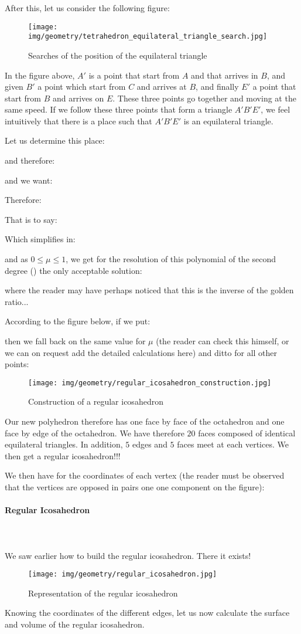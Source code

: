 {	After this, let us consider the following figure:
	\begin{figure}[H]
		\centering
		\texttt{[image: img/geometry/tetrahedron\_equilateral\_triangle\_search.jpg]}
		\caption{Searches of the position of the equilateral triangle}
	\end{figure}
	In the figure above, $A'$ is a point that start from $A$ and that arrives in $B$, and given $B'$ a point which start from $C$ and arrives at $B$, and finally $E'$ a point that start from $B$ and arrives on $E$. These three points go together and moving at the same speed. If we follow these three points that form a triangle $A'B'E'$, we feel intuitively that there is a place such that $A'B'E'$ is an equilateral triangle.
	
	Let us determine this place:
	
	and therefore:
	
	and we want:
	
	Therefore:
	
	That is to say:
	
	Which simplifies in:
	
	and as $0\leq \mu \leq 1$, we get for the resolution of this polynomial of the second degree () the only acceptable solution:
	
	where the reader may have perhaps noticed that this is the inverse of the golden ratio...
	
	According to the figure below, if we put:
	
	then we fall back on the same value for $\mu$ (the reader can check this himself, or we can on request add the detailed calculations here) and ditto for all other points:
	\begin{figure}[H]
		\centering
		\texttt{[image: img/geometry/regular\_icosahedron\_construction.jpg]}
		\caption{Construction of a regular icosahedron}
	\end{figure}
	Our new polyhedron therefore has one face by face of the octahedron and one face by edge of the octahedron. We have therefore $20$ faces composed of identical equilateral triangles. In addition, $5$ edges and $5$ faces meet at each vertices. We then get a regular icosahedron!!!
	
	We then have for the coordinates of each vertex (the reader must be observed that the vertices are opposed in pairs one one component on the figure):
	
	
	\paragraph{Regular Icosahedron}\mbox{}\\\\
	We saw earlier how to build the regular icosahedron. There it exists!
	\begin{figure}[H]
		\centering
		\texttt{[image: img/geometry/regular\_icosahedron.jpg]}
		\caption{Representation of the regular icosahedron}
	\end{figure}
	Knowing the coordinates of the different edges, let us now calculate the surface and volume of the regular icosahedron.
	
}
